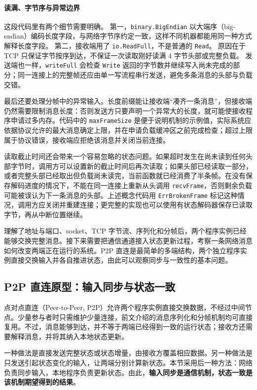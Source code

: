 \paragraph{读满、字节序与异常边界}
这段代码里有两个细节需要明确。
第一，\texttt{binary.BigEndian} 以大端序（big-endian）编码长度字段，与网络字节序约定一致，这样不同机器都能用同一种方式解释长度字段。
第二，接收端用了 \texttt{io.ReadFull}，不是普通的 \texttt{Read}。
原因在于 TCP 只保证字节按序到达，不保证一次读取刚好读满 4 字节头部或完整负载。
发送端也一样，\texttt{writeFull} 会检查 \texttt{Write} 返回的字节数并继续写入尚未完成的部分；同一连接上的完整帧还应由单一写流程串行发送，避免多条消息的头部与负载交错。

最后还要处理分帧中的异常输入。长度前缀能让接收端“凑齐一条消息”，但接收端仍然需要限制消息长度：否则发送方只要声明一个异常大的长度，就可能使接收程序申请过多内存。代码中的 \texttt{maxFrameSize} 是便于说明机制的示例值，实际系统应依据协议允许的最大消息确定上限，并在申请负载缓冲区之前完成检查；超过上限属于协议错误，接收端应拒绝该消息并关闭当前连接。

读取截止时间还会带来一个容易忽略的状态问题。如果超时发生在尚未读到任何头部字节时，调用方可以设置新的截止时间后再次读取；如果头部已经读取一部分，或者完整头部已经取出但负载尚未读完，当前函数就已经消费了半条帧。在没有保存解码进度的情况下，不能在同一连接上重新从头调用 \texttt{recvFrame}，否则剩余负载可能被误认为下一条消息的头部。上述概念代码用 \texttt{ErrBrokenFrame} 标记这种情况，调用方应关闭并重建连接；更完整的实现也可以使用有状态解码器保存已读取字节，再从中断位置继续。

理解了地址与端口、socket、TCP 字节流、序列化和分帧后，两个程序实例已经能够交换完整消息。接下来需要把通信通道接入状态更新过程，考察一条网络消息如何改变两端正在运行的系统。P2P 直连是最简单的多端结构，两个独立程序实例直接交换输入并各自推进状态，由此可以观察同步与一致性的基本问题。

\subsection{P2P 直连原型：输入同步与状态一致}\label{sec2:p2p-prototype}

点对点直连（Peer-to-Peer, P2P）允许两个程序实例直接交换数据，不经过中间节点。少量参与者时只需维护少量连接，前文介绍的消息序列化和分帧机制均可直接复用。不过，消息能够到达，并不等于两端已经得到一致的运行状态；接收方还需要解释消息，并将其纳入本地状态更新。

一种做法是直接发送完整状态或状态增量，由接收方覆盖相应数据。另一种做法是只发送引起状态变化的输入，让两端分别计算新状态。本节采用后一种方法：网络负责同步输入，本地程序负责更新状态。由此，\textbf{输入同步是通信机制，状态一致是该机制期望得到的结果}。

